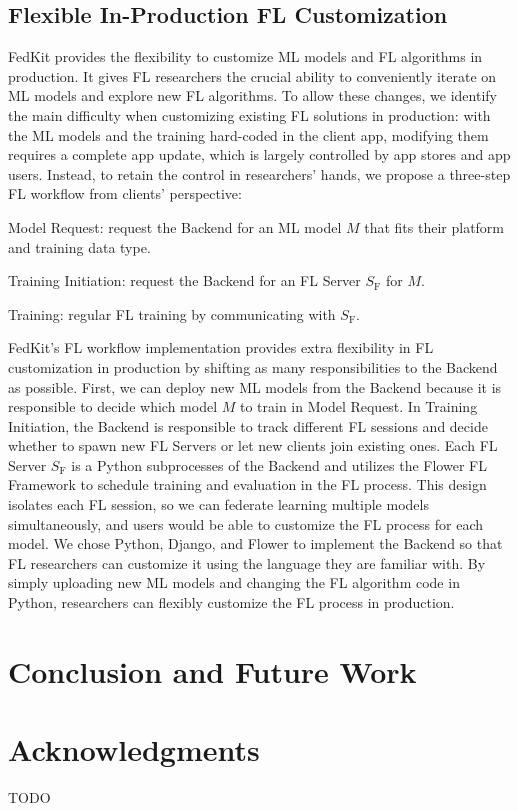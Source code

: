 \documentclass[letterpaper]{article} %
\begin{document}
\subsection{Flexible In-Production FL Customization}
\newcommand{\model}{$M$}
\newcommand{\fs}{$S_\mathrm F$}
FedKit provides the flexibility to customize ML models and FL algorithms
in production.
It gives FL researchers the crucial ability to
conveniently iterate on ML models and explore new FL algorithms.
To allow these changes, we identify the main difficulty when
customizing existing FL solutions in production:
with the ML models and the training hard-coded in the client app,
modifying them requires a complete app update,
which is largely controlled by app stores and app users.
Instead, to retain the control in researchers' hands,
we propose a three-step FL workflow from clients' perspective:
\begin{enumerate*}[label=\arabic*.]
    \item Model Request: request the Backend for an ML model \model{} that fits
        their platform and training data type.
    \item Training Initiation: request the Backend for an FL Server \fs{}
        for \model.
    \item Training: regular FL training by communicating with \fs.
\end{enumerate*}

FedKit's FL workflow implementation provides extra flexibility in
FL customization in production by
shifting as many responsibilities to the Backend as possible.
First, we can deploy new ML models from the Backend because
it is responsible to decide which model \model{} to train in Model Request.
In Training Initiation,
the Backend is responsible to track different FL sessions and
decide whether
to spawn new FL Servers or let new clients join existing ones.
Each FL Server \fs{} is a Python subprocesses of the Backend and
utilizes the Flower FL Framework to
schedule training and evaluation in the FL process.
This design isolates each FL session,
so we can federate learning multiple models simultaneously, and
users would be able to customize the FL process for each model.
We chose Python, Django, and Flower to implement the Backend so that
FL researchers can customize it using the language they are familiar with.
By simply uploading new ML models and
changing the FL algorithm code in Python,
researchers can flexibly customize the FL process in production.


\section{Conclusion and Future Work}


\appendix

\section*{Acknowledgments}
TODO

\bigskip


\end{document}
